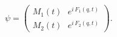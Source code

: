 \begin{equation}
\psi =\left( 
\begin{array}{l}
M_{1}\left( t\right) \,\,\,\,e^{i\,F_{1}\left( q,t\right) } \\ 
M_{2}\left( t\right) \,\,\,\,e^{i\,F_{2}\left( q,t\right) }
\end{array}
\right) .\,  \label{spinor}
\end{equation}

